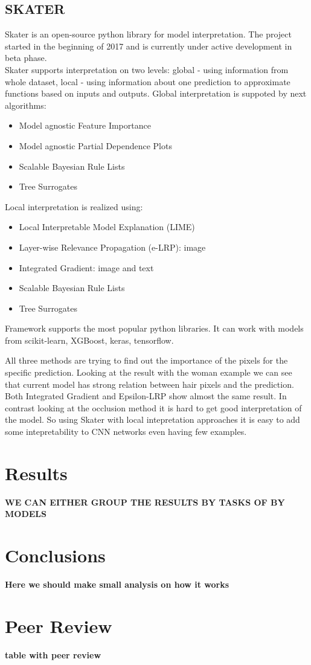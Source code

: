 \subsection{SKATER}
Skater is an open-source python library for model interpretation. The project started in the beginning of 2017 and is currently under active development in beta phase. \\
Skater supports interpretation on two levels: global - using information from whole dataset, local - using information about one prediction to approximate functions based on inputs and outputs. Global interpretation is suppoted by next algorithms:
\begin{itemize}
    \item Model agnostic Feature Importance
    \item Model agnostic Partial Dependence Plots
    \item Scalable Bayesian Rule Lists
    \item Tree Surrogates
\end{itemize}
Local interpretation is realized using:
\begin{itemize}
    \item Local Interpretable Model Explanation (LIME)
    \item Layer-wise Relevance Propagation (e-LRP): image
    \item Integrated Gradient: image and text
    \item Scalable Bayesian Rule Lists
    \item Tree Surrogates
\end{itemize}

Framework supports the most popular python libraries. It can work with models from scikit-learn, XGBoost, keras, tensorflow.


All three methods are trying to find out the importance of the pixels for the specific prediction.
Looking at the result with the woman example we can see that current model has strong relation between hair pixels and the prediction. Both Integrated Gradient and Epsilon-LRP show almost the same result. In contrast looking at the occlusion method it is hard to get good interpretation of the model. So using Skater with local intepretation approaches it is easy to add some intepretability to CNN networks even having few examples.

\section{Results}
\textbf{WE CAN EITHER GROUP THE RESULTS BY TASKS OF BY MODELS}

\section{Conclusions}
\textbf{Here we should make small analysis on how it works}

\section{Peer Review}
\textbf{table with peer review}

\newpage
\printbibliography
